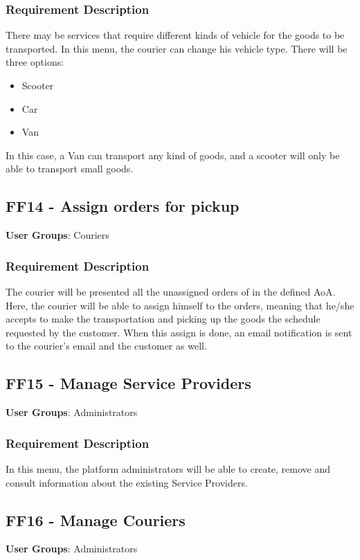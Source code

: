 \subsubsection{Requirement Description}
There may be services that require different kinds of vehicle for the goods to be transported. In this menu, the courier can change his vehicle type. There will be three options:
\begin{itemize}
    \item Scooter
    \item Car
    \item Van
\end{itemize}

In this case, a Van can transport any kind of goods, and a scooter will only be able to transport small goods.


\subsection{FF14 - Assign orders for pickup}
\textbf{User Groups}: Couriers

\subsubsection{Requirement Description}
The courier will be presented all the unassigned orders of in the defined \gls{AoA}. Here, the courier will be able to assign himself to the orders, meaning that he/she accepts to make the transportation and picking up the goods the schedule requested by the customer. When this assign is done, an email notification is sent to the courier’s email and the customer as well.

\clearpage
\subsection{FF15 - Manage Service Providers}
\textbf{User Groups}: Administrators

\subsubsection{Requirement Description}
In this menu, the platform administrators will be able to create, remove and consult information about the existing Service Providers.

\subsection{FF16 - Manage Couriers}
\textbf{User Groups}: Administrators

